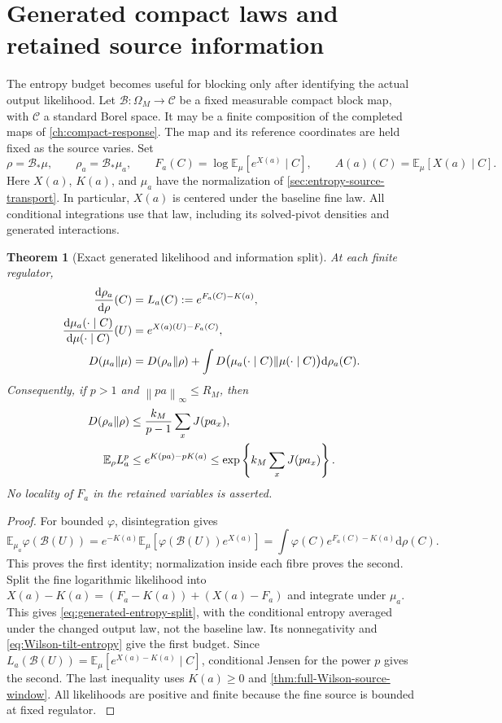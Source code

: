 \documentclass[11pt,oneside,openany]{book}
\newtheorem{theorem}{Theorem}[chapter]
\theoremstyle{definition}
\theoremstyle{remark}
\newcommand{\E}{\mathbb E}
\newcommand{\dd}{\mathrm d}
\newcommand{\norm}[1]{\left\lVert#1\right\rVert}
\newcommand{\src}[2]{\cite[#2]{#1}}
\begin{document}
\section{Generated compact laws and retained source information}
\label{sec:generated-source-laws}
The entropy budget becomes useful for blocking only after identifying the
actual output likelihood. Let $\mathcal B:\Omega_M\to\mathcal C$ be a
fixed measurable compact block map, with $\mathcal C$ a standard Borel
space. It may be a finite composition of the completed maps of
\cref{ch:compact-response}. The map and its reference coordinates are
held fixed as the source varies. Set
\[
 \rho=\mathcal B_*\mu,\qquad \rho_a=\mathcal B_*\mu_a,\qquad
 F_a(C)=\log\E_\mu[e^{X(a)}\mid C],\qquad
 A(a)(C)=\E_\mu[X(a)\mid C].
\]
Here $X(a)$, $K(a)$, and $\mu_a$ have the normalization of
\cref{sec:entropy-source-transport}. In particular, $X(a)$ is centered
under the baseline fine law. All conditional integrations use that law,
including its solved-pivot densities and generated interactions.

\begin{theorem}[Exact generated likelihood and information split]
\label{thm:generated-likelihood}
At each finite regulator,
\begin{align}
 \frac{\dd\rho_a}{\dd\rho}(C)&=L_a(C):=e^{F_a(C)-K(a)},\notag\\
 \frac{\dd\mu_a(\cdot\mid C)}{\dd\mu(\cdot\mid C)}(U)
       &=e^{X(a)(U)-F_a(C)},\label{eq:generated-likelihood}\\
 D(\mu_a\Vert\mu)&=D(\rho_a\Vert\rho)
  +\int D\bigl(\mu_a(\cdot\mid C)\Vert\mu(\cdot\mid C)\bigr)
                                               \dd\rho_a(C).
 \label{eq:generated-entropy-split}
\end{align}
Consequently, if $p>1$ and $\norm{pa}_\infty\le R_M$, then
\begin{align}
 D(\rho_a\Vert\rho)&\le
       \frac{k_M}{p-1}\sum_xJ(pa_x),\notag\\
 \E_\rho L_a^p&\le e^{K(pa)-pK(a)}
                    \le\exp\left\{k_M\sum_xJ(pa_x)\right\}.
 \label{eq:generated-source-budgets}
\end{align}
No locality of $F_a$ in the retained variables is asserted.
\end{theorem}
\begin{proof}
For bounded $\varphi$, disintegration gives
\[
 \E_{\mu_a}\varphi(\mathcal B(U))
 =e^{-K(a)}\E_\mu[\varphi(\mathcal B(U))e^{X(a)}]
 =\int\varphi(C)e^{F_a(C)-K(a)}\dd\rho(C).
\]
This proves the first identity; normalization inside each fibre proves
the second. Split the fine logarithmic likelihood into
$X(a)-K(a)=(F_a-K(a))+(X(a)-F_a)$ and integrate under $\mu_a$.
This gives \cref{eq:generated-entropy-split}, with the conditional
entropy averaged under the changed output law, not the baseline law.
Its nonnegativity and \cref{eq:Wilson-tilt-entropy} give the first
budget. Since $L_a(\mathcal B(U))=\E_\mu[e^{X(a)-K(a)}\mid C]$,
conditional Jensen for the power $p$ gives the second. The last
inequality uses $K(a)\ge0$ and
\cref{thm:full-Wilson-source-window}. All likelihoods are positive
and finite because the fine source is bounded at fixed regulator.
\src{F15}{V2}
\end{proof}
\end{document}
